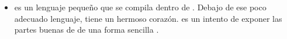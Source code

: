 \begin{itemize}
		\item
			\textbf{\coffeescript} es un lenguaje pequeño que se compila dentro de \javaScriptNAME. Debajo de ese poco adecuado lenguaje, \javaScriptNAME tiene un hermoso corazón. \coffeescript es un intento de exponer las partes buenas de \javaScriptNAME de una forma sencilla \cite{technology_coffeescript}.
		
			
	\end{itemize}